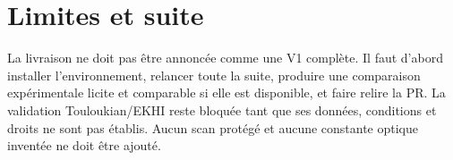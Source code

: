 \documentclass[11pt,a4paper]{article}
\begin{document}
\section{Limites et suite}
La livraison ne doit pas être annoncée comme une V1 complète. Il faut d'abord installer l'environnement, relancer toute la suite, produire une comparaison expérimentale licite et comparable si elle est disponible, et faire relire la PR. La validation Touloukian/EKHI reste bloquée tant que ses données, conditions et droits ne sont pas établis. Aucun scan protégé et aucune constante optique inventée ne doit être ajouté.
\end{document}
